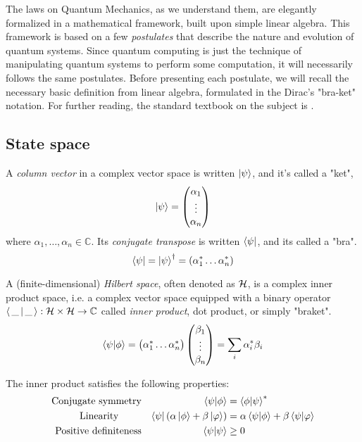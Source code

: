 
The laws on Quantum Mechanics, as we understand them, are elegantly formalized in a mathematical framework, built upon simple linear algebra. This framework is based on a few \textit{postulates} that describe the nature and evolution of quantum systems. Since quantum computing is just the technique of manipulating quantum systems to perform some computation, it will necessarily follows the same postulates. Before presenting each postulate, we will recall the necessary basic definition from linear algebra, formulated in the Dirac's "bra-ket" notation. For further reading, the standard textbook on the subject is \cite{nielsen_chuang_2010}.


\subsection{State space}

A \textit{column vector} in a complex vector space is written $\ket{\psi}$, and it's called a "ket",
\[ \ket{\psi} = \begin{pmatrix}
		\alpha_1\\
		\vdots\\
		\alpha_n
\end{pmatrix}
\]
where $\alpha_1, \ldots,  \alpha_n \in \mathbb{C}$. Its \textit{conjugate transpose} is written $\bra{\psi}$, and its called a "bra".
	\[
		\bra{\psi} = \ket{\psi}^\dagger = (\alpha_1^* \ldots \alpha_n^*)
	\]

A (finite-dimensional) \textit{Hilbert space}, often denoted as $\cal{H}$, is a complex inner product space, i.e. a complex vector space equipped with a binary operator $\braket{  \,\_\, |\, \_\, }: \mathcal{H} \times \mathcal{H} \rightarrow \mathbb{C}$ called \textit{inner product}, dot product, or simply "braket".
\[
	\braket{\psi | \phi} = 
	\begin{pmatrix}
	\alpha_1^* \ldots \alpha_n^*
	\end{pmatrix}\begin{pmatrix}
	\beta_1 \\
	\vdots \\
	\beta_n
	\end{pmatrix} = 
	\sum_i \alpha_i^*\beta_i
\]

The inner product satisfies the following properties:
\begin{align*}
\text{Conjugate symmetry} & &  \braket{\psi | \phi} &= \braket{\phi | \psi}^* \\
\text{Linearity \quad\quad} & & \bra{\psi} (\alpha\ket{\phi} + \beta\ket{\varphi}) &= \alpha\braket{\psi | \phi} + \beta\braket{\psi | \varphi}\\
\text{Positive definiteness} & & \braket{\psi | \psi} &\geq 0
\end{align*}

